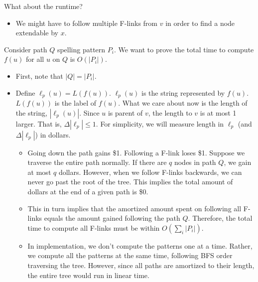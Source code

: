 \documentclass[10pt]{article}
\begin{document}
What about the runtime?
\begin{itemize}
	\item We might have to follow multiple F-links from $v$ in order to find a node extendable by $x$.
\end{itemize}
Consider path $Q$ spelling pattern $P_i$.  We want to prove the total time to compute $f(u)$ for all $u$ on $Q$ is $O(|P_i|)$.
\begin{itemize}
	\item First, note that $|Q| = |P_i|$.
	\item Define $\ell_p(u) = L(f(u))$.  $\ell_p(u)$ is the string represented by $f(u)$.  $L(f(u))$ is the label of $f(u)$.  What we care about now is the length of the string, $|\ell_p(u)|$.  Since $u$ is parent of $v$, the length to $v$ is at most 1 larger.  That is, $\Delta |\ell_p| \leq 1$.  For simplicity, we will measure length in $\ell_p$ (and $\Delta |\ell_p|$) in dollars.
	\begin{itemize}
	    \item Going down the path gains \$1.  Following a F-link loses \$1.  Suppose we traverse the entire path normally.  If there are $q$ nodes in path $Q$, we gain at most $q$ dollars.  However, when we follow F-links backwards, we can never go past the root of the tree.  This implies the total amount of dollars at the end of a given path is \$0.
	    \item This in turn implies that the amortized amount spent on following all F-links equals the amount gained following the path $Q$.  Therefore, the total time to compute all F-links must be within $O(\sum_i |P_i|)$.
	    \item In implementation, we don't compute the patterns one at a time.  Rather, we compute all the patterns at the same time, following BFS order traversing the tree.  However, since all paths are amortized to their length, the entire tree would run in linear time.
    \end{itemize}
\end{itemize}
\end{document}
